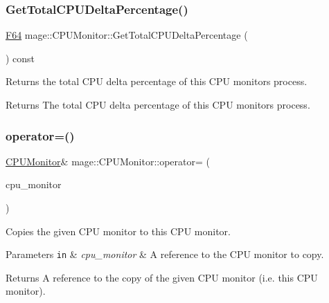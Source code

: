 \subsubsection{\texorpdfstring{Get\+Total\+C\+P\+U\+Delta\+Percentage()}{GetTotalCPUDeltaPercentage()}}
{\footnotesize\ttfamily \hyperlink{namespacemage_ad26233bbec640deda836e572c1a23708}{F64} mage\+::\+C\+P\+U\+Monitor\+::\+Get\+Total\+C\+P\+U\+Delta\+Percentage (\begin{DoxyParamCaption}{ }\end{DoxyParamCaption}) const\hspace{0.3cm}{\ttfamily [noexcept]}}

Returns the total C\+PU delta percentage of this C\+PU monitor\textquotesingle{}s process.

\begin{DoxyReturn}{Returns}
The total C\+PU delta percentage of this C\+PU monitor\textquotesingle{}s process. 
\end{DoxyReturn}
\hypertarget{classmage_1_1_c_p_u_monitor_a6009df0994652d011a78d1f12013e599}{}\label{classmage_1_1_c_p_u_monitor_a6009df0994652d011a78d1f12013e599} 
\subsubsection{\texorpdfstring{operator=()}{operator=()}\hspace{0.1cm}{\footnotesize\ttfamily [1/2]}}
{\footnotesize\ttfamily \hyperlink{classmage_1_1_c_p_u_monitor}{C\+P\+U\+Monitor}\& mage\+::\+C\+P\+U\+Monitor\+::operator= (\begin{DoxyParamCaption}\item[{const \hyperlink{classmage_1_1_c_p_u_monitor}{C\+P\+U\+Monitor} \&}]{cpu\+\_\+monitor }\end{DoxyParamCaption})}

Copies the given C\+PU monitor to this C\+PU monitor.


\begin{DoxyParams}[1]{Parameters}
\mbox{\tt in}  & {\em cpu\+\_\+monitor} & A reference to the C\+PU monitor to copy. \\
\hline
\end{DoxyParams}
\begin{DoxyReturn}{Returns}
A reference to the copy of the given C\+PU monitor (i.\+e. this C\+PU monitor). 
\end{DoxyReturn}
\hypertarget{classmage_1_1_c_p_u_monitor_af1eacba414b2db72cf13d335f78785cd}{}\label{classmage_1_1_c_p_u_monitor_af1eacba414b2db72cf13d335f78785cd} 
